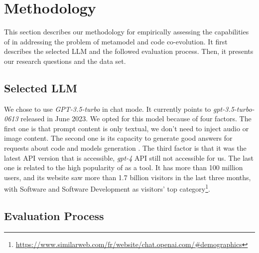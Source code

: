 \section{Methodology}
\label{ch3_evaluation}

This section describes our methodology for empirically assessing the capabilities of \LLM in addressing the problem of metamodel and code co-evolution. 
It first describes the selected LLM and the followed evaluation process.
Then, it presents our research questions and the data set.

\subsection{Selected LLM}\label{selectedLLM}

We chose to use \LLM \emph{GPT-3.5-turbo} in chat mode. It currently points to \emph{gpt-3.5-turbo-0613} released in June 2023. We opted for this model because of four factors. The first one is that prompt content is only textual, we don't need to inject audio or image content. The second one is its capacity to generate good answers for requests about code and models generation \cite{nathalia2023artificial,yeticstiren2023evaluating,guo2023exploring,fu2023chatgpt,kabir2023empirical,chaaben2023towards,camara2023assessment}. The third factor is that it was the latest API version that is accessible, \emph{gpt-4} API still not accessible for us. The last one is related to the high popularity of \LLM as a tool. It has more than 100 million users, and its website saw more than 1.7 billion visitors in the last three months, with Software and Software Development as visitors' top category\footnote{\url{https://www.similarweb.com/fr/website/chat.openai.com/\#demographics}}. 


\subsection{Evaluation Process}


